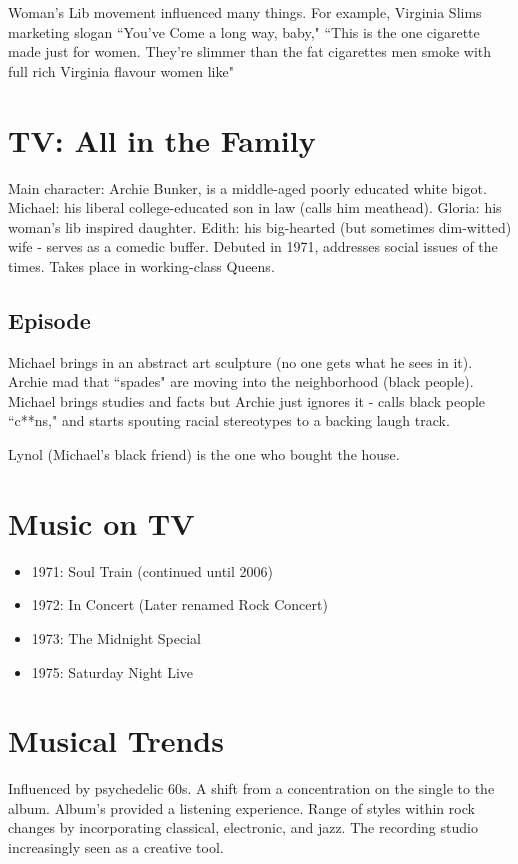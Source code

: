 \documentclass[12pt, a4paper, twoside, openright, titlepage]{book}
\begin{document}
Woman's Lib movement influenced many things. For example, Virginia Slims marketing slogan ``You've Come a long way, baby," ``This is the one cigarette made just for women. They're slimmer than the fat cigarettes men smoke with full rich Virginia flavour women like"


\section{TV: All in the Family}

Main character: Archie Bunker, is a middle-aged poorly educated white bigot. Michael: his liberal college-educated son in law (calls him meathead). Gloria: his woman's lib inspired daughter. Edith: his big-hearted (but sometimes dim-witted) wife - serves as a comedic buffer. Debuted in 1971, addresses social issues of the times. Takes place in working-class Queens.

\subsection{Episode}

Michael brings in an abstract art sculpture (no one gets what he sees in it). Archie mad that ``spades" are moving into the neighborhood (black people). Michael brings studies and facts but Archie just ignores it - calls black people ``c**ns," and starts spouting racial stereotypes to a backing laugh track.

Lynol (Michael's black friend) is the one who bought the house.


\section{Music on TV}

\begin{itemize}
    \item 1971: Soul Train (continued until 2006)
    \item 1972: In Concert (Later renamed Rock Concert)
    \item 1973: The Midnight Special
    \item 1975: Saturday Night Live
\end{itemize}


\section{Musical Trends}

Influenced by psychedelic 60s. A shift from a concentration on the single to the album. Album's provided a listening experience. Range of styles within rock changes by incorporating classical, electronic, and jazz. The recording studio increasingly seen as a creative tool.
\end{document}
